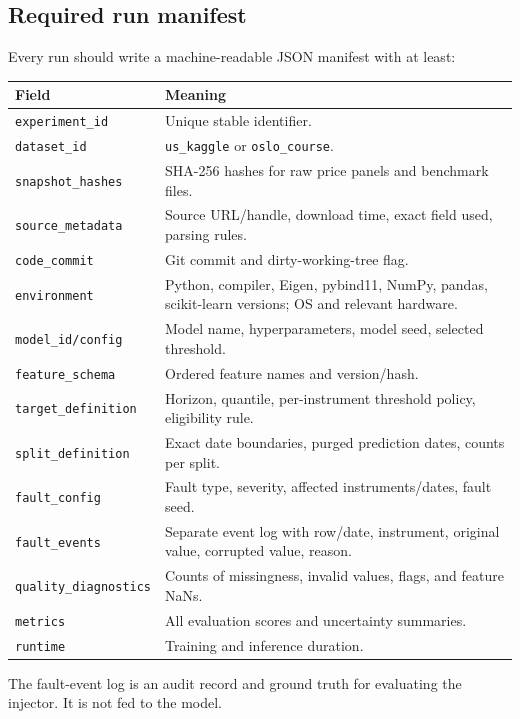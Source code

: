 \documentclass[11pt,a4paper]{article}
\begin{document}
\subsection{Required run manifest}

Every run should write a machine-readable JSON manifest with at least:
\begin{longtable}{p{4.0cm}p{9.8cm}}
\toprule
\textbf{Field} & \textbf{Meaning}\\
\midrule
\texttt{experiment\_id} & Unique stable identifier.\\
\texttt{dataset\_id} & \texttt{us\_kaggle} or \texttt{oslo\_course}.\\
\texttt{snapshot\_hashes} & SHA-256 hashes for raw price panels and benchmark files.\\
\texttt{source\_metadata} & Source URL/handle, download time, exact field used, parsing rules.\\
\texttt{code\_commit} & Git commit and dirty-working-tree flag.\\
\texttt{environment} & Python, compiler, Eigen, pybind11, NumPy, pandas, scikit-learn versions; OS and relevant hardware.\\
\texttt{model\_id/config} & Model name, hyperparameters, model seed, selected threshold.\\
\texttt{feature\_schema} & Ordered feature names and version/hash.\\
\texttt{target\_definition} & Horizon, quantile, per-instrument threshold policy, eligibility rule.\\
\texttt{split\_definition} & Exact date boundaries, purged prediction dates, counts per split.\\
\texttt{fault\_config} & Fault type, severity, affected instruments/dates, fault seed.\\
\texttt{fault\_events} & Separate event log with row/date, instrument, original value, corrupted value, reason.\\
\texttt{quality\_diagnostics} & Counts of missingness, invalid values, flags, and feature NaNs.\\
\texttt{metrics} & All evaluation scores and uncertainty summaries.\\
\texttt{runtime} & Training and inference duration.\\
\bottomrule
\end{longtable}

The fault-event log is an audit record and ground truth for evaluating the injector. It is not fed to the model.
\end{document}
